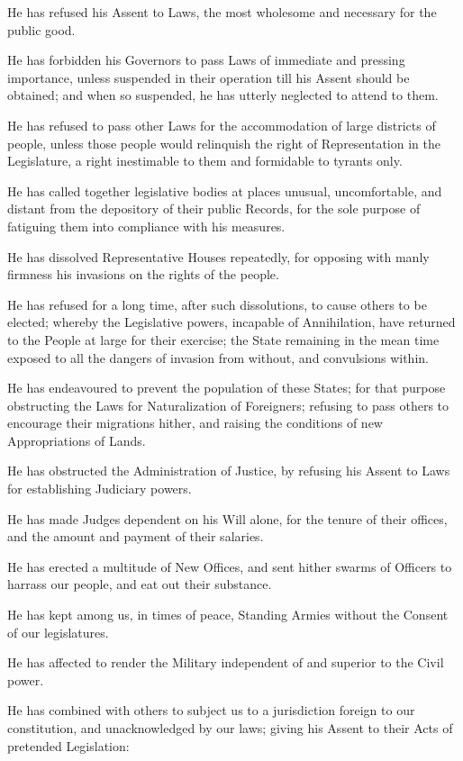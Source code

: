 \documentclass[a4paper,landscape,10pt]{article}
\begin{document}
He has refused his Assent to Laws,
the most wholesome and necessary for the public good.

He has forbidden his Governors to pass Laws of immediate and pressing importance,
unless suspended in their operation till his Assent should be obtained;
and when so suspended, he has utterly neglected to attend to them.

He has refused to pass other Laws for the accommodation of large districts of people,
unless those people would relinquish the right of Representation in the Legislature,
a right inestimable to them and formidable to tyrants only.

He has called together legislative bodies at places unusual, uncomfortable, and distant from the depository of their public Records,
for the sole purpose of fatiguing them into compliance with his measures.

He has dissolved Representative Houses repeatedly,
for opposing with manly firmness his invasions on the rights of the people.

He has refused for a long time, after such dissolutions, to cause others to be elected;
whereby the Legislative powers, incapable of Annihilation, have returned to the People at large for their exercise;
the State remaining in the mean time exposed to all the dangers of invasion from without, and convulsions within.

He has endeavoured to prevent the population of these States;
for that purpose obstructing the Laws for Naturalization of Foreigners;
refusing to pass others to encourage their migrations hither,
and raising the conditions of new Appropriations of Lands.

He has obstructed the Administration of Justice,
by refusing his Assent to Laws for establishing Judiciary powers.

He has made Judges dependent on his Will alone,
for the tenure of their offices,
and the amount and payment of their salaries.

He has erected a multitude of New Offices,
and sent hither swarms of Officers to harrass our people,
and eat out their substance.

He has kept among us, in times of peace,
Standing Armies without the Consent of our legislatures.

He has affected to render the Military independent of and superior to the Civil power.

He has combined with others to subject us to a jurisdiction foreign to our constitution,
and unacknowledged by our laws; giving his Assent to their Acts of pretended Legislation:
\end{document}

